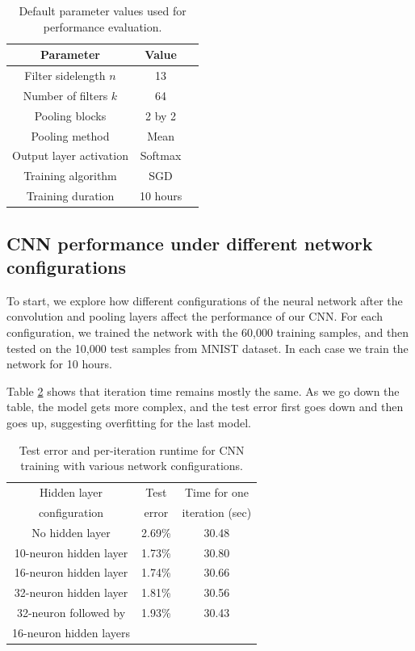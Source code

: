 \documentclass[10pt,twocolumn]{article}
\begin{document}
\begin{table}
\begin{center}
\begin{tabular}{| c | c | c |}
\hline
Parameter & Value \\
\hline \hline
Filter sidelength $n$ & 13 \\
\hline
Number of filters $k$ & 64 \\
\hline
Pooling blocks & 2 by 2 \\
\hline
Pooling method & Mean \\
\hline
Output layer activation & Softmax \\
\hline
Training algorithm & SGD \\
\hline
Training duration & 10 hours \\
\hline
\end{tabular}
\end{center}
\caption{Default parameter values used for performance evaluation.}
\label{table:evaldefault}
\end{table}

\subsection{CNN performance under different network configurations}

To start, we explore how different configurations of the neural network after the convolution and pooling layers affect the performance of our CNN. For each configuration, we trained the network with the 60,000 training samples, and then tested on the 10,000 test samples from MNIST dataset. In each case we train the network for 10 hours.

Table \ref{table:change_in_neurons_in_hidden_layer} shows that iteration time remains mostly the same. As we go down the table, the model gets more complex, and the test error first goes down and then goes up, suggesting overfitting for the last model.

\begin{table}
\begin{center}
\begin{tabular}{| c | c | c |}
\hline
Hidden layer & Test & Time for one \\
configuration & error & iteration (sec) \\
\hline \hline
No hidden layer & 2.69\% & 30.48 \\
\hline
10-neuron hidden layer & 1.73\% & 30.80 \\
\hline
16-neuron hidden layer & 1.74\% & 30.66 \\
\hline
32-neuron hidden layer & 1.81\% & 30.56 \\
\hline
32-neuron followed by & 1.93\% & 30.43 \\
16-neuron hidden layers & & \\
\hline
\end{tabular}
\end{center}
\caption{Test error and per-iteration runtime for CNN training with various network configurations.}
\label{table:change_in_neurons_in_hidden_layer}
\end{table}
\end{document}
